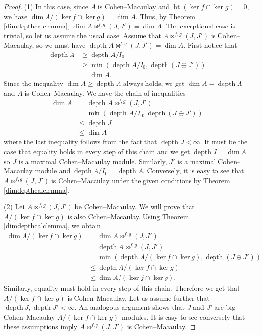 \documentclass{amsart}%
\theoremstyle{plain}
\numberwithin{equation}{section}
\theoremstyle{definition}
\DeclareMathOperator{\depth}{depth}
\DeclareMathOperator{\height}{ht}
\begin{document}
\begin{proof}
     (1) In this case, since $A$ is Cohen--Macaulay and $\height(\ker f \cap \ker g) = 0$, we have $\dim A/(\ker f \cap \ker g) = \dim A$. Thus, by Theorem \ref{dimdepthcalclemma}, $\dim A\bowtie^{f,g}(J,J')=\dim A$. The exceptional case is trivial, so let us assume the usual case. Assume that $A\bowtie^{f,g}(J,J')$ is Cohen--Macaulay, so we must have $\depth A\bowtie^{f,g}(J,J')=\dim A$. First notice that
        \begin{align*}
            \depth A&\ge\depth A/I_0\\
&\ge\min(\depth A/I_0 ,\depth (J\oplus J'))\\&=\dim A.
        \end{align*}
    Since the inequality $\dim A\ge \depth A$ always holds,  we get $\dim A=\depth A$ and $A$ is Cohen--Macaulay. We have the chain of inequalities
    \begin{align*}
        \dim A&=\depth A\bowtie^{f,g}(J,J')\\
        &=\min(\depth A/I_0 ,\depth (J\oplus J'))\\&\le\depth J\\&\le\dim A
    \end{align*}
    where the last inequality follows from the fact that $\depth J<\infty$. It must be the case that equality holds in every step of this chain and we get $\depth J=\dim A$ so $J$ is a maximal Cohen--Macaulay module. Similarly, $J'$ is a maximal Cohen--Macaulay module and $\depth A/I_0=\depth A$. Conversely, it is easy to see that $A\bowtie^{f,g}(J,J')$ is Cohen--Macaulay under the given conditions by Theorem \ref{dimdepthcalclemma}.\medskip

    (2) Let $A\bowtie^{f,g}(J,J')$ be Cohen--Macaulay. We will prove that $A/(\ker f\cap \ker g)$ is also Cohen--Macaulay. Using Theorem \ref{dimdepthcalclemma}, we obtain
        \begin{align*}
            \dim A/(\ker f\cap\ker g)&=\dim A\bowtie^{f,g}(J,J')\\&=\depth A\bowtie^{f,g}(J,J')\\
&=\min(\depth A/(\ker f\cap\ker g) ,\depth (J\oplus J'))\\&\le\depth A/(\ker f\cap\ker g)\\&\le\dim A/(\ker f\cap\ker g).
        \end{align*}
        Similarly, equality must hold in every step of this chain. Therefore we get that $A/(\ker f\cap\ker g)$ is Cohen--Macaulay. Let us assume further that $\depth J,\depth J'<\infty$. An analogous argument shows that $J$ and $J'$ are big Cohen--Macaulay $A/(\ker f\cap\ker g)$--modules. It is easy to see conversely that these assumptions imply $A\bowtie^{f,g}(J,J')$ is Cohen--Macaulay.
\end{proof}
\end{document}
